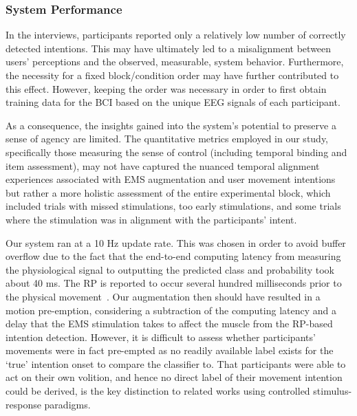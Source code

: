 \subsubsection{System Performance}
In the interviews, participants reported only a relatively low number of correctly detected intentions. This may have ultimately led to a misalignment between users' perceptions and the observed, measurable, system behavior. Furthermore, the necessity for a fixed block/condition order may have further contributed to this effect. However, keeping the order was necessary in order to first obtain training data for the BCI based on the unique EEG signals of each participant.

As a consequence, the insights gained into the system's potential to preserve a sense of agency are limited. The quantitative metrics employed in our study, specifically those measuring the sense of control (including temporal binding and item assessment), may not have captured the nuanced temporal alignment experiences associated with EMS augmentation and user movement intentions but rather a more holistic assessment of the entire experimental block, which included trials with missed stimulations, too early stimulations, and some trials where the stimulation was in alignment with the participants' intent.

Our system ran at a 10 Hz update rate. This was chosen in order to avoid buffer overflow due to the fact that the end-to-end computing latency from measuring the physiological signal to outputting the predicted class and probability took about 40 ms. The RP is reported to occur several hundred milliseconds prior to the physical movement~\cite{Schurger2021-vp}. Our augmentation then should have resulted in a motion pre-emption, considering a subtraction of the computing latency and a delay that the EMS stimulation takes to affect the muscle from the RP-based intention detection. However, it is difficult to assess whether participants' movements were in fact pre-empted as no readily available label exists for the `true' intention onset to compare the classifier to. That participants were able to act on their own volition, and hence no direct label of their movement intention could be derived, is the key distinction to related works using controlled stimulus-response paradigms.


